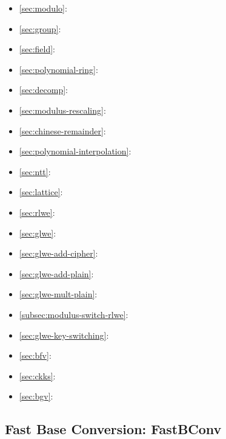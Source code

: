 \begin{tcolorbox}[
    title = \textbf{Required Background},    %
    colback = white,    %
    colframe = black,  %
    boxrule = 0.8pt,     %
    left = 1mm, right = 1mm, top = 1mm, bottom = 1mm %
]

\begin{itemize}
\item \autoref{sec:modulo}: 
\item \autoref{sec:group}: 
\item \autoref{sec:field}: 
\item \autoref{sec:polynomial-ring}: 
\item \autoref{sec:decomp}: 
\item \autoref{sec:modulus-rescaling}: 
\item \autoref{sec:chinese-remainder}: 
\item \autoref{sec:polynomial-interpolation}: 
\item \autoref{sec:ntt}: 
\item \autoref{sec:lattice}: 
\item \autoref{sec:rlwe}: 
\item \autoref{sec:glwe}: 
\item \autoref{sec:glwe-add-cipher}: 
\item \autoref{sec:glwe-add-plain}: 
\item \autoref{sec:glwe-mult-plain}: 
\item \autoref{subsec:modulus-switch-rlwe}: 
\item \autoref{sec:glwe-key-switching}: 
\item \autoref{sec:bfv}: 
\item \autoref{sec:ckks}: 
\item \autoref{sec:bgv}: 
\end{itemize}
\end{tcolorbox}

\clearpage

\subsection{Fast Base Conversion: \textsf{FastBConv}}
\label{subsec:rns-fastbconv}

